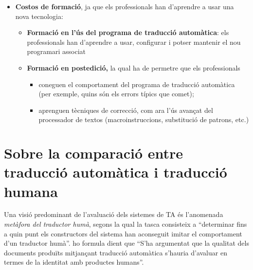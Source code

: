 \begin{enumerate}
\begin{enumerate}
\begin{itemize}
  \item \textbf{Costos de formació}, ja que els professionals han
    d'aprendre a usar una nova tecnologia:
    \begin{itemize}
    \item \textbf{Formació en l'ús del programa de traducció
        automàtica}: els professionals han d'aprendre a usar,
      configurar i potser mantenir el nou programari associat
    \item \textbf{Formació en postedició,} la qual ha de permetre que
      els professionals
      \begin{itemize}
      \item coneguen el comportament del programa de traducció
        automàtica (per exemple, quins són els errors típics que
        comet);
      \item aprenguen tècniques de correcció, com ara l'ús avançat del
        processador de textos (macroinstruccions, substitució de
        patrons, etc.)
      \end{itemize}
    \end{itemize}
  \end{itemize}


\end{enumerate}
\end{enumerate}

\section[Traducció automàtica i traducció humana]{Sobre la comparació entre traducció auto\-mà\-tica i
  traducció humana} 
\label{ss:humaut}
Una visió predominant de l'avaluació dels sistemes de TA és
l'anomenada \emph{metàfora del traductor humà}, segons la qual
\citep{krauwer93j} la tasca consisteix a ``determinar fins a quin punt
els constructors del sistema han aconseguit imitar el comportament
d'un traductor humà''. \citet[p.~262]{sager93b} ho formula dient que ``S'ha
argumentat que la qualitat dels documents produïts mitjançant
traducció automàtica s'hauria d'avaluar en termes de la identitat amb
productes humans''.
  
